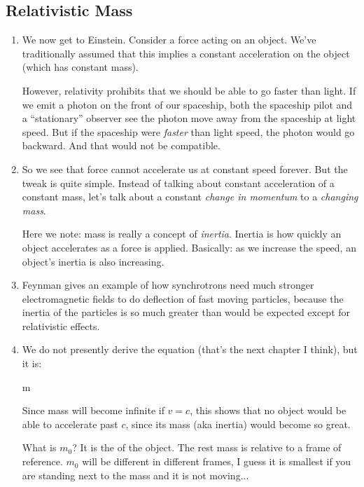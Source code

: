 \subsection{Relativistic Mass}

\begin{enumerate}

  \item We now get to Einstein. Consider a force acting on an object.
  We've traditionally assumed that this implies a constant acceleration
  on the object (which has constant mass).

  However, relativity prohibits that we should be able to go faster than
  light. If we emit a photon on the front of our spaceship, both the
  spaceship pilot and a ``stationary'' observer see the photon move away
  from the spaceship at light speed. But if the spaceship were
  \emph{faster} than light speed, the photon would go backward. And that
  would not be compatible.

  \item So we see that force cannot accelerate us at constant speed
  forever. But the tweak is quite simple. Instead of talking about
  constant acceleration of a constant mass, let's talk about a constant
  \emph{change in momentum} to a \emph{changing mass}.

  Here we note: mass is really a concept of \emph{inertia}. Inertia is
  how quickly an object accelerates as a force is applied. Basically: as
  we increase the speed, an object's inertia is also increasing.

  \item Feynman gives an example of how synchrotrons need much stronger
  electromagnetic fields to do deflection of fast moving particles,
  because the inertia of the particles is so much greater than would be
  expected except for relativistic effects.

  \item We do not presently derive the equation (that's the next chapter
  I think), but it is:

  \begin{nedqn}
    m
  \eqcol
  \end{nedqn}

  Since mass will become infinite if $v = c$, this shows that no object
  would be able to accelerate past $c$, since its mass (aka inertia)
  would become so great.

  What is $m_0$? It is the  of the object. The rest
  mass is relative to a frame of reference. $m_0$ will be different in
  different frames, I guess it is smallest if you are standing next to
  the mass and it is not moving...

\end{enumerate}
